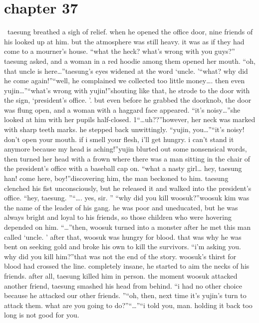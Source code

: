 \section{chapter 37}






 taesung breathed a sigh of relief.
 when he opened the office door, nine friends of his looked up at him.
 but the atmosphere was still heavy.
 it was as if they had come to a mourner’s house.
“what the heck? what’s wrong with you guys?” taesung asked, and a woman in a red hoodie among them opened her mouth.
“oh, that uncle is here…”taesung’s eyes widened at the word ‘uncle.
’“what? why did he come again!”“well, he complained we collected too little money….
then even yujin…”“what’s wrong with yujin!”shouting like that, he strode to the door with the sign, ‘president’s office.
’.
but even before he grabbed the doorknob, the door was flung open, and a woman with a haggard face appeared.
“it’s noisy…”she looked at him with her pupils half-closed.
1“…uh??”however, her neck was marked with sharp teeth marks.
he stepped back unwittingly.
“yujin, you…”“it’s noisy! don’t open your mouth.
 if i smell your flesh, i’ll get hungry.
 i can’t stand it anymore because my head is aching!”yujin blurted out some nonsensical words, then turned her head with a frown where there was a man sitting in the chair of the president’s office with a baseball cap on.
“what a nasty girl… hey, taesung han! come here, boy!”discovering him, the man beckoned to him.
 taesung clenched his fist unconsciously, but he released it and walked into the president’s office.
“hey, taesung.
”“….
yes, sir.
”
“why did you kill woosuk?”woosuk kim was the name of the leader of his gang.
 he was poor and uneducated, but he was always bright and loyal to his friends, so those children who were hovering depended on him.
“…”then, woosuk turned into a monster after he met this man called ‘uncle.
’ after that, woosuk was hungry for blood.
 that was why he was bent on seeking gold and broke his own to kill the survivors.
“i’m asking you.
 why did you kill him?”that was not the end of the story.
 woosuk’s thirst for blood had crossed the line.
 completely insane, he started to aim the necks of his friends.
 after all, taesung killed him in person.
 the moment woosuk attacked another friend, taesung smashed his head from behind.
“i had no other choice because he attacked our other friends.
”“oh, then, next time it’s yujin’s turn to attack them.
 what are you going to do?”“…”“i told you, man.
 holding it back too long is not good for you.
